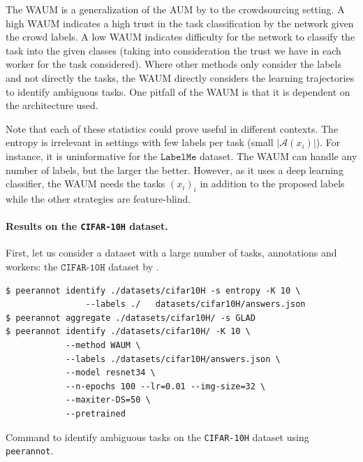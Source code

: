 The WAUM is a generalization of the AUM by \citet{pleiss_identifying_2020} to the crowdsourcing setting. A high WAUM indicates a high trust in the task classification by the network given the crowd labels. A low WAUM indicates difficulty for the network to classify the task into the given classes (taking into consideration the trust we have in each worker for the task considered). Where other methods only consider the labels and not directly the tasks, the WAUM directly considers the learning trajectories to identify ambiguous tasks. One pitfall of the WAUM is that it is dependent on the architecture used.

Note that each of these statistics could prove useful in different contexts.
The entropy is irrelevant in settings with few labels per task (small $|\mathcal{A}(x_i)|$). For instance, it is uninformative for the $\texttt{LabelMe}$ dataset.
The WAUM can handle any number of labels, but the larger the better. However, as it uses a deep learning classifier, the WAUM needs the tasks $(x_i)_i$ in addition to the proposed labels while the other strategies are feature-blind.

\paragraph{Results on the \texttt{CIFAR-10H} dataset.}

First, let us consider a dataset with a large number of tasks, annotations and workers: the $\texttt{CIFAR-10H}$ dataset by \citet{peterson_human_2019}.

\begin{listing}[H]
    \begin{verbatim}
$ peerannot identify ./datasets/cifar10H -s entropy -K 10 \
                --labels ./   datasets/cifar10H/answers.json
$ peerannot aggregate ./datasets/cifar10H/ -s GLAD
$ peerannot identify ./datasets/cifar10H/ -K 10 \
            --method WAUM \
            --labels ./datasets/cifar10H/answers.json \
            --model resnet34 \
            --n-epochs 100 --lr=0.01 --img-size=32 \
            --maxiter-DS=50 \
            --pretrained

    \end{verbatim}
\caption{Command to identify ambiguous tasks on the \texttt{CIFAR-10H} dataset using \texttt{peerannot}.}
\label{lst:peeranot_identify_c10h}
\end{listing}

